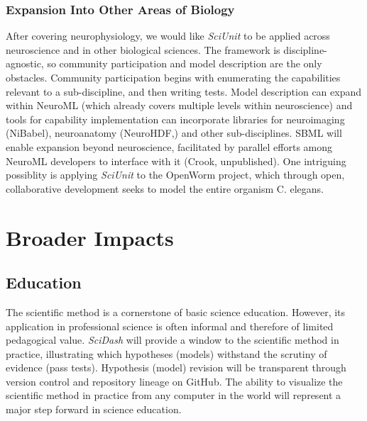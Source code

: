 \documentclass[11pt,letterpaper]{article}
\begin{document}
\subsubsection{Expansion Into Other Areas of Biology}
After covering neurophysiology, we would like \textit{SciUnit} to be applied across neuroscience and in other biological sciences. 
The framework is discipline-agnostic, so community participation and model description are the only obstacles. 
Community participation begins with enumerating the capabilities relevant to a sub-discipline, and then writing tests. 
Model description can expand within NeuroML (which already covers multiple levels within neuroscience) and tools for capability implementation can incorporate libraries for neuroimaging (NiBabel\cite{nibabel_url}), neuroanatomy (NeuroHDF,\cite{neurohdf_url}) and other sub-disciplines. 
SBML\cite{hucka_systems_2003,sbml_url} will enable expansion beyond neuroscience, facilitated by parallel efforts among NeuroML developers to interface with it (Crook, unpublished). 
One intriguing possiblity is applying \textit{SciUnit} to the OpenWorm project\cite{open_worm_url}, which through open, collaborative development seeks to model the entire organism C. elegans.  

\section{Broader Impacts}
\label{sec:broader_impacts}
\subsection{Education}
\label{sec:education}
The scientific method is a cornerstone of basic science education. 
However, its application in professional science is often informal and therefore of limited pedagogical value. 
\textit{SciDash} will provide a window to the scientific method in practice, illustrating which hypotheses (models) withstand the scrutiny of evidence (pass tests). 
Hypothesis (model) revision will be transparent through version control and repository lineage on GitHub. 
The ability to visualize the scientific method in practice from any computer in the world will represent a major step forward in science education.  
\end{document}

